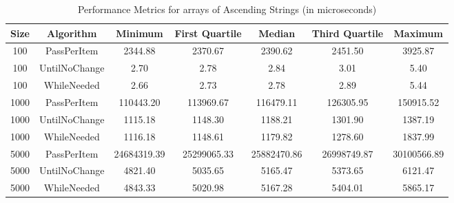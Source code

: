 \documentclass{article}
\begin{document}
\begin{table}[htbp]
    \centering
    \begin{tabular}{ccccccc}
        \toprule
        \textbf{Size} & \textbf{Algorithm} & \textbf{Minimum} & \textbf{First Quartile} & \textbf{Median} & \textbf{Third Quartile} & \textbf{Maximum} \\
        \midrule
        100 & PassPerItem & 2344.88 & 2370.67 & 2390.62 & 2451.50 & 3925.87 \\
        100 & UntilNoChange & 2.70 & 2.78 & 2.84 & 3.01 & 5.40 \\
        100 & WhileNeeded & 2.66 & 2.73 & 2.78 & 2.89 & 5.44 \\
        1000 & PassPerItem & 110443.20 & 113969.67 & 116479.11 & 126305.95 & 150915.52 \\
        1000 & UntilNoChange & 1115.18 & 1148.30 & 1188.21 & 1301.90 & 1387.19 \\
        1000 & WhileNeeded & 1116.18 & 1148.61 & 1179.82 & 1278.60 & 1837.99 \\
        5000 & PassPerItem & 24684319.39 & 25299065.33 & 25882470.86 & 26998749.87 & 30100566.89 \\
        5000 & UntilNoChange & 4821.40 & 5035.65 & 5165.47 & 5373.65 & 6121.47 \\
        5000 & WhileNeeded & 4843.33 & 5020.98 & 5167.28 & 5404.01 & 5865.17 \\
        \bottomrule
    \end{tabular}
    \caption{Performance Metrics for arrays of Ascending Strings (in microseconds)}
    \label{tab:performance_7}
\end{table}
\end{document}
